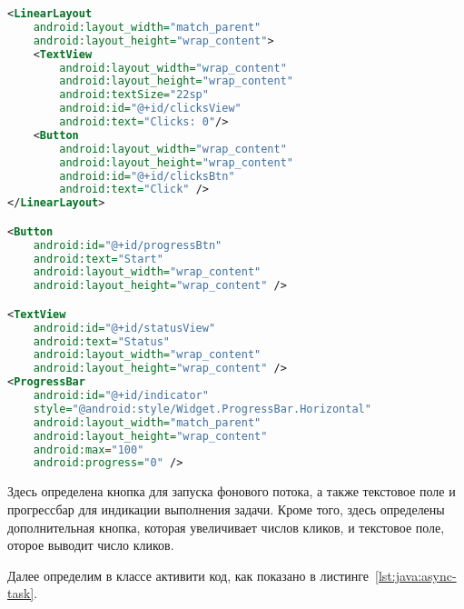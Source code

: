 \begin{lstlisting}[language=XML
	, label=lst:xml:async-task
	]
<LinearLayout
	android:layout_width="match_parent"
	android:layout_height="wrap_content">
	<TextView
		android:layout_width="wrap_content"
		android:layout_height="wrap_content"
		android:textSize="22sp"
		android:id="@+id/clicksView"
		android:text="Clicks: 0"/>
	<Button
		android:layout_width="wrap_content"
		android:layout_height="wrap_content"
		android:id="@+id/clicksBtn"
		android:text="Click" />
</LinearLayout>

<Button
	android:id="@+id/progressBtn"
	android:text="Start"
	android:layout_width="wrap_content"
	android:layout_height="wrap_content" />

<TextView
	android:id="@+id/statusView"
	android:text="Status"
	android:layout_width="wrap_content"
	android:layout_height="wrap_content" />
<ProgressBar
	android:id="@+id/indicator"
	style="@android:style/Widget.ProgressBar.Horizontal"
	android:layout_width="match_parent"
	android:layout_height="wrap_content"
	android:max="100"
	android:progress="0" />
\end{lstlisting}

Здесь определена кнопка для запуска фонового потока, а также текстовое
поле и прогрессбар для индикации выполнения задачи. Кроме того, здесь
определены дополнительная кнопка, которая увеличивает числов кликов,
и текстовое поле, оторое выводит число кликов.\par
Далее определим в классе активити код, как показано
в листинге~\ref{lst:java:async-task}.

